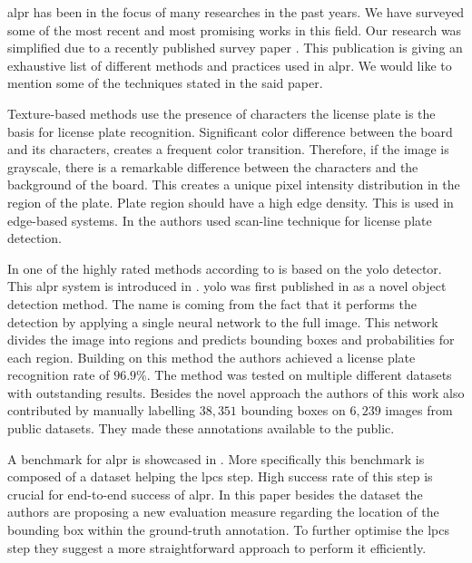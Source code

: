 

\gls{alpr} has been in the focus of many researches in the past years.
We have surveyed some of the most recent and most promising works in this field.
Our research was simplified due to a recently published survey paper \cite{survOnMet}.
This publication is giving an exhaustive list of different methods and practices used in \gls{alpr}.
We would like to mention some of the techniques stated in the said paper.


Texture-based methods use the presence of characters the license plate is the basis for license plate recognition. Significant color difference between the board and its characters, creates a frequent color transition. Therefore, if the image is grayscale, there is a remarkable difference between the characters and the background of the board. This creates a unique pixel intensity distribution in the region of the plate. Plate region should have a high edge density. This is used in edge-based systems. In \cite{HongFuJiaHuan} the authors used scan-line technique for license plate detection.



In one of the highly rated methods according to \cite{survOnMet} is based on the \gls{yolo} detector.
This \gls{alpr} system is introduced in \cite{DBLP:journals/corr/abs-1909-01754}. \gls{yolo} was first published in \cite{redmon2016look} as a novel object detection method.
The name is coming from the fact that it performs the detection by applying a single neural network to the full image.
This network divides the image into regions and predicts bounding boxes and probabilities for each region. 
Building on this method the authors achieved a license plate recognition rate of $96.9\%$.
The method was tested on multiple different datasets with outstanding results. 
Besides the novel approach the authors of this work also contributed by manually labelling $38,351$ bounding boxes on $6,239$ images from public datasets.
They made these annotations available to the public.

A benchmark for \gls{alpr} is showcased in \cite{DBLP:journals/corr/GoncalvesSMS16}. More specifically this benchmark is composed of a dataset helping the \gls{lpcs} step. High success rate of this step is crucial for end-to-end success of \gls{alpr}. In this paper besides the dataset the authors are proposing a new evaluation measure regarding the location of the bounding box within the ground-truth annotation. To further optimise the \gls{lpcs} step they suggest a more straightforward approach to perform it efficiently.









